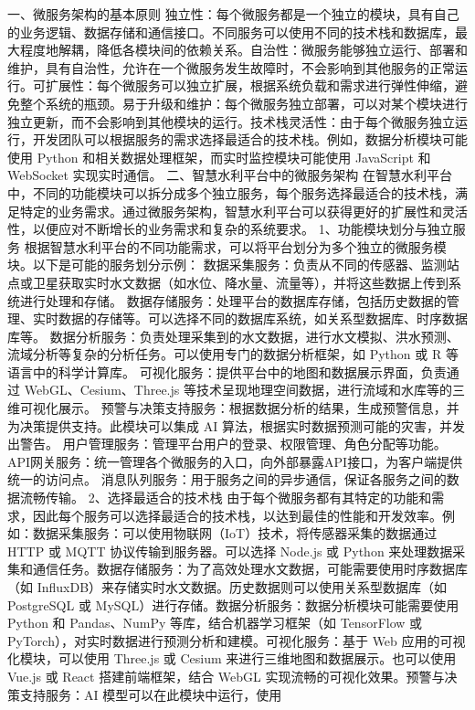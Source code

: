 {一、微服务架构的基本原则
独立性：每个微服务都是一个独立的模块，具有自己的业务逻辑、数据存储和通信接口。不同服务可以使用不同的技术栈和数据库，最大程度地解耦，降低各模块间的依赖关系。自治性：微服务能够独立运行、部署和维护，具有自治性，允许在一个微服务发生故障时，不会影响到其他服务的正常运行。可扩展性：每个微服务可以独立扩展，根据系统负载和需求进行弹性伸缩，避免整个系统的瓶颈。易于升级和维护：每个微服务独立部署，可以对某个模块进行独立更新，而不会影响到其他模块的运行。技术栈灵活性：由于每个微服务独立运行，开发团队可以根据服务的需求选择最适合的技术栈。例如，数据分析模块可能使用
Python 和相关数据处理框架，而实时监控模块可能使用 JavaScript 和 WebSocket 实现实时通信。 二、智慧水利平台中的微服务架构
在智慧水利平台中，不同的功能模块可以拆分成多个独立服务，每个服务选择最适合的技术栈，满足特定的业务需求。通过微服务架构，智慧水利平台可以获得更好的扩展性和灵活性，以便应对不断增长的业务需求和复杂的系统要求。 1、功能模块划分与独立服务
根据智慧水利平台的不同功能需求，可以将平台划分为多个独立的微服务模块。以下是可能的服务划分示例： 数据采集服务：负责从不同的传感器、监测站点或卫星获取实时水文数据（如水位、降水量、流量等），并将这些数据上传到系统进行处理和存储。
数据存储服务：处理平台的数据库存储，包括历史数据的管理、实时数据的存储等。可以选择不同的数据库系统，如关系型数据库、时序数据库等。
数据分析服务：负责处理采集到的水文数据，进行水文模拟、洪水预测、流域分析等复杂的分析任务。可以使用专门的数据分析框架，如 Python 或 R 等语言中的科学计算库。 可视化服务：提供平台中的地图和数据展示界面，负责通过
WebGL、Cesium、Three.js 等技术呈现地理空间数据，进行流域和水库等的三维可视化展示。 预警与决策支持服务：根据数据分析的结果，生成预警信息，并为决策提供支持。此模块可以集成 AI
算法，根据实时数据预测可能的灾害，并发出警告。 用户管理服务：管理平台用户的登录、权限管理、角色分配等功能。 API网关服务：统一管理各个微服务的入口，向外部暴露API接口，为客户端提供统一的访问点。
消息队列服务：用于服务之间的异步通信，保证各服务之间的数据流畅传输。 2、选择最适合的技术栈
由于每个微服务都有其特定的功能和需求，因此每个服务可以选择最适合的技术栈，以达到最佳的性能和开发效率。例如：数据采集服务：可以使用物联网（IoT）技术，将传感器采集的数据通过 HTTP 或 MQTT 协议传输到服务器。可以选择
Node.js 或 Python 来处理数据采集和通信任务。数据存储服务：为了高效处理水文数据，可能需要使用时序数据库（如 InfluxDB）来存储实时水文数据。历史数据则可以使用关系型数据库（如 PostgreSQL 或
MySQL）进行存储。数据分析服务：数据分析模块可能需要使用 Python 和 Pandas、NumPy 等库，结合机器学习框架（如 TensorFlow 或 PyTorch），对实时数据进行预测分析和建模。可视化服务：基于 Web
应用的可视化模块，可以使用 Three.js 或 Cesium 来进行三维地图和数据展示。也可以使用 Vue.js 或 React 搭建前端框架，结合 WebGL 实现流畅的可视化效果。预警与决策支持服务：AI 模型可以在此模块中运行，使用
}
